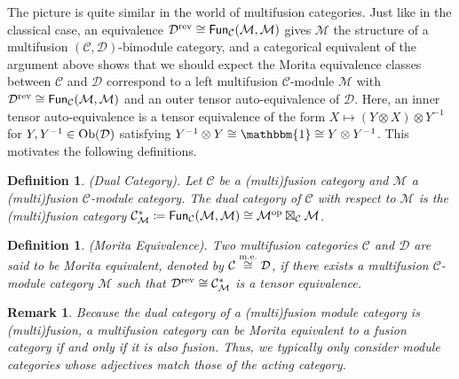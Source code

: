 \documentclass[12pt, reqno]{amsart}
\numberwithin{equation}{section}
\theoremstyle{plainspace}
\theoremstyle{definitionspace}
\newtheorem{definition}[theorem]{Definition}
\theoremstyle{remarkspace}
\newtheorem{remark}[theorem]{Remark}
\newcommand{\mathcat}[1]{\mathcal{#1}}
\newcommand{\Ob}{\textup{Ob}}
\newcommand{\Fun}[2][]{
	\ifthenelse{\equal{#2}{}}
		{\textcat{Fun}_{#1}}
		{\textcat{Fun}_{#1}\!\left(#2\right)}
}
\newcommand{\opcat}[1]{{#1}^{\textup{op}}}
\newcommand{\revcat}[1]{{#1}^{\textup{rev}}}
\newcommand{\textcat}[1]{\textup{\textsf{#1}}}
\newcommand{\bimodcat}[3][]{#2\textcat{-Mod}_{#1}\textcat{-}#3}
\newcommand{\moreq}{\stackrel{\textup{m.e.}}{\cong}}
\begin{document}
\noindent The picture is quite similar in the world of multifusion categories. Just like in the classical case, an equivalence $\revcat{\mathcat{D}} \cong \Fun[\mathcat{C}]{\mathcat{M}, \mathcat{M}}$ gives $\mathcat{M}$ the structure of a multifusion $(\mathcat{C}, \mathcat{D})$-bimodule category, and a categorical equivalent of the argument above shows that we should expect the Morita equivalence classes between $\mathcat{C}$ and $\mathcat{D}$ correspond to a left multifusion $\mathcat{C}$-module $\mathcat{M}$ with $\revcat{\mathcat{D}} \cong \Fun[\mathcat{C}]{\mathcat{M}, \mathcat{M}}$ and an outer tensor auto-equivalence of $\mathcat{D}$. Here, an inner tensor auto-equivalence is a tensor equivalence of the form $X \mapsto (Y \otimes X) \otimes Y^{-1}$ for $Y, Y^{-1} \in \Ob(\mathcat{D})$ satisfying $Y^{-1} \otimes Y \cong \mathbbm{1} \cong Y \otimes Y^{-1}$. This motivates the following definitions.
\newline

\begin{definition}\label{def:dual_category}{\em (Dual Category).} \cite[Definition 7.12.2]{Etingof_2016}
Let $\mathcat{C}$ be a (multi)fusion category and $\mathcat{M}$ a (multi)fusion $\mathcat{C}$-module category. The {\em dual category} of $\mathcat{C}$ with respect to $\mathcat{M}$ is the (multi)fusion category $\mathcat{C}_{\mathcat{M}}^{*} \coloneqq \Fun[\mathcat{C}]{\mathcat{M}, \mathcat{M}} \cong \opcat{\mathcat{M}} \boxtimes_{\mathcat{C}} \mathcat{M}$.
\end{definition}
\leavevmode

\begin{definition}\label{def:morita_equivalence}{\em (Morita Equivalence).} \cite[Definition 7.12.17]{Etingof_2016}
Two multifusion categories $\mathcat{C}$ and $\mathcat{D}$ are said to be {\em Morita equivalent}, denoted by $\mathcat{C} \moreq \mathcat{D}$, if there exists a multifusion $\mathcat{C}$-module category $\mathcat{M}$ such that $\revcat{\mathcat{D}} \cong \mathcat{C}_{\mathcat{M}}^{*}$ is a tensor equivalence.%
\end{definition}
\leavevmode

\begin{remark}\label{rem:morita_equivalence_adjectives}
Because the dual category of a (multi)fusion module category is (multi)fusion, a multifusion category can be Morita equivalent to a fusion category if and only if it is also fusion. Thus, we typically only consider module categories whose adjectives match those of the acting category.
\end{remark}
\leavevmode\newline
\end{document}
